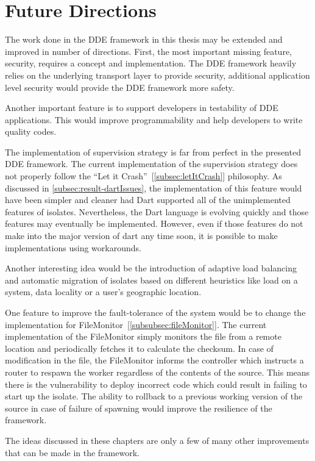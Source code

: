 \chapter{Future Directions}\label{chapter:future_directions}


  The work done in the DDE framework in this thesis may be extended and improved in number of directions. First, the most important missing feature, security, requires a concept and implementation. The DDE framework heavily relies on the underlying transport layer to provide security, additional application level security would provide the DDE framework more safety.

  Another important feature is to support developers in testability of DDE applications. This would improve programmability and help developers to write quality codes.

  The implementation of supervision strategy is far from perfect in the presented DDE framework. The current implementation of the supervision strategy does not properly follow the “Let it Crash”~[\autoref{subsec:letItCrash}] philosophy. As discussed in \autoref{subsec:result-dartIssues}, the implementation of this feature would have been simpler and cleaner had Dart supported  all of the unimplemented features of isolates. Nevertheless, the Dart language is evolving quickly and those features may eventually be implemented. However, even if those features do not make into the major version of dart any time soon, it is possible to make implementations using workarounds.

  Another interesting idea would be the introduction of adaptive load balancing and automatic migration of isolates based on different heuristics like load on a system, data locality or a user's geographic location.

  One feature to improve the fault-tolerance of the system would be to change the implementation for FileMonitor~[\autoref{subsubsec:fileMonitor}]. The current implementation of the FileMonitor simply monitors the file from a remote location and periodically fetches it to calculate the checksum. In case of modification in the file, the FileMonitor informs the controller which instructs a router to respawn the worker regardless of the contents of the source. This means there is the vulnerability to deploy incorrect code which could result in failing to start up the isolate. The ability to rollback to a previous working version of the source in case of failure of spawning would improve the resilience of the framework.

  The ideas discussed in these chapters are only a few of many other improvements that can be made in the framework.
